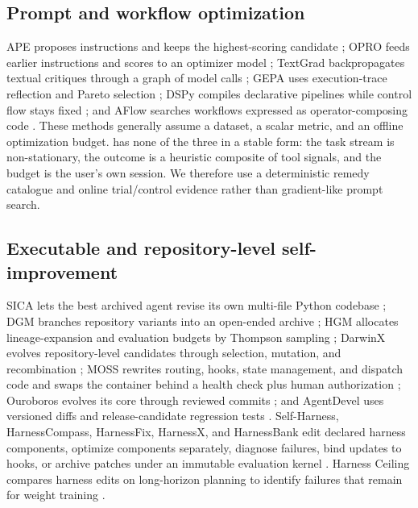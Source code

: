 \subsection{Prompt and workflow optimization}
APE proposes instructions and keeps the highest-scoring candidate \citep{zhou2023large}; OPRO feeds earlier instructions and scores to an optimizer model \citep{yang2024large}; TextGrad backpropagates textual critiques through a graph of model calls \citep{yuksekgonul2025textgrad}; GEPA uses execution-trace reflection and Pareto selection \citep{agrawal2026gepa}; DSPy compiles declarative pipelines while control flow stays fixed \citep{khattab2024dspy}; and AFlow searches workflows expressed as operator-composing code \citep{zhang2025aflow}. These methods generally assume a dataset, a scalar metric, and an offline optimization budget. \system{} has none of the three in a stable form: the task stream is non-stationary, the outcome is a heuristic composite of tool signals, and the budget is the user's own session. We therefore use a deterministic remedy catalogue and online trial/control evidence rather than gradient-like prompt search.

\subsection{Executable and repository-level self-improvement}
SICA lets the best archived agent revise its own multi-file Python codebase \citep{robeyns2025selfimproving}; DGM branches repository variants into an open-ended archive \citep{zhang2026darwin}; HGM allocates lineage-expansion and evaluation budgets by Thompson sampling \citep{wang2025huxley}; DarwinX evolves repository-level candidates through selection, mutation, and recombination \citep{zhang2026darwinx}; MOSS rewrites routing, hooks, state management, and dispatch code and swaps the container behind a health check plus human authorization \citep{cai2026moss}; Ouroboros evolves its core through reviewed commits \citep{razzhigaev2026ouroboros}; and AgentDevel uses versioned diffs and release-candidate regression tests \citep{zhang2026agentdevel}. Self-Harness, HarnessCompass, HarnessFix, HarnessX, and HarnessBank edit declared harness components, optimize components separately, diagnose failures, bind updates to hooks, or archive patches under an immutable evaluation kernel \citep{zhang2026selfharness,zhang2026harnesscompass,chen2026harnessfix,chen2026harnessx,luo2026harnessbank}. Harness Ceiling compares harness edits on long-horizon planning to identify failures that remain for weight training \citep{tian2026ceiling}.

